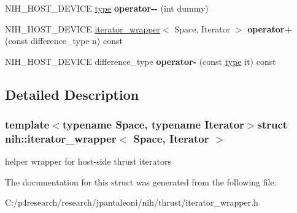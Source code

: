 \begin{DoxyCompactItemize}
\item 
\hypertarget{structnih_1_1iterator__wrapper_a2b90497f750402492ad42a3f0a3a16d3}{
\-N\-I\-H\-\_\-\-H\-O\-S\-T\-\_\-\-D\-E\-V\-I\-C\-E \hyperlink{structnih_1_1iterator__wrapper}{type} {\bfseries operator-\/-\/} (int dummy)}
\label{structnih_1_1iterator__wrapper_a2b90497f750402492ad42a3f0a3a16d3}

\item 
\hypertarget{structnih_1_1iterator__wrapper_a1348e6959afb8c746d6ed562b49f055b}{
\-N\-I\-H\-\_\-\-H\-O\-S\-T\-\_\-\-D\-E\-V\-I\-C\-E \*
\hyperlink{structnih_1_1iterator__wrapper}{iterator\-\_\-wrapper}$<$ \-Space, \*
\-Iterator $>$ {\bfseries operator+} (const difference\-\_\-type n) const }
\label{structnih_1_1iterator__wrapper_a1348e6959afb8c746d6ed562b49f055b}

\item 
\hypertarget{structnih_1_1iterator__wrapper_afa7abb5801720e66ffde56b64063f8a9}{
\-N\-I\-H\-\_\-\-H\-O\-S\-T\-\_\-\-D\-E\-V\-I\-C\-E difference\-\_\-type {\bfseries operator-\/} (const \hyperlink{structnih_1_1iterator__wrapper}{type} it) const }
\label{structnih_1_1iterator__wrapper_afa7abb5801720e66ffde56b64063f8a9}

\end{DoxyCompactItemize}


\subsection{\-Detailed \-Description}
\subsubsection*{template$<$typename Space, typename Iterator$>$struct nih\-::iterator\-\_\-wrapper$<$ Space, Iterator $>$}

helper wrapper for host-\/side thrust iterators 

\-The documentation for this struct was generated from the following file\-:\begin{DoxyCompactItemize}
\item 
\-C\-:/p4research/research/jpantaleoni/nih/thrust/iterator\-\_\-wrapper.\-h\end{DoxyCompactItemize}
